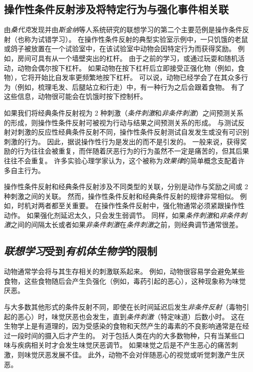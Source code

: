\subsection{操作性条件反射涉及将特定行为与强化事件相关联}

由\textit{桑代克}发现并由\textit{斯金纳}等人系统研究的联想学习的第二个主要范例是操作条件反射（也称为试错学习）。
在操作性条件反射的典型实验室示例中，一只饥饿的老鼠或鸽子被放置在一个试验室中，在该试验室中动物会因特定行为而获得奖励。
例如，房间可具有从一个墙壁突出的杠杆。
由于之前的学习，或通过玩耍和随机活动，动物会偶尔按下杠杆。
如果动物在按下杠杆后立即接受正强化物（例如，食物），它将开始比自发率更频繁地按下杠杆。
可以说，动物已经学会了在其众多行为（例如，梳理毛发、后腿站立和行走）中，有一种行为之后会跟着食物。
有了这些信息，动物很可能会在饥饿时按下控制杆。


如果我们将经典条件反射视为 2 种刺激（\textit{条件刺激}和\textit{非条件刺激}）之间预测关系的形成，则操作性条件反射可被视为行动与结果之间预测关系的形成。
与测试反射对刺激的反应性经典条件反射不同，操作性条件反射测试自发发生或没有可识别刺激的行为。
因此，据说操作性行为是发出的而不是引发的。
一般来说，获得奖励的行为往往会被重复，而伴随着厌恶行为的行为虽然不一定是痛苦的，但其后果往往不会重复。
许多实验心理学家认为，这个被称为\textit{效果律}的简单概念支配着许多自主行为。


操作性条件反射和经典条件反射涉及不同类型的关联，分别是动作与奖励之间或 2 种刺激之间的关联。
然而，操作性条件反射和经典条件反射的规律非常相似。
例如，时机对两者都至关重要。
在操作性条件反射中，强化物通常必须紧跟操作性动作。
如果强化剂延迟太久，只会发生弱调节。
同样，如果\textit{条件刺激}和\textit{非条件刺激}之间的间隔太长或者如果\textit{非条件刺激}在\textit{条件刺激}之前，则经典调节通常很差。



\subsection{\textit{联想学习}受到\textit{有机体生物学}的限制}

动物通常学会将与其生存相关的刺激联系起来。
例如，动物很容易学会避免某些食物，这些食物随后会产生负强化（例如，毒药引起的恶心），这种现象称为味觉厌恶。


与大多数其他形式的条件反射不同，即使在长时间延迟后发生\textit{非条件反射}（毒物引起的恶心）时，味觉厌恶也会发生，直到\textit{条件刺激}（特定味道）后数小时。
这在生物学上是有道理的，因为受感染的食物和天然产生的毒素的不良影响通常是在经过一段时间的摄入后才产生的。
对于包括人类在内的大多数物种，只有当某些口味与疾病相关时才会发生味觉厌恶调节。
如果味觉之后是不产生恶心的痛苦刺激，则味觉厌恶发展不佳。
此外，动物不会对伴随恶心的视觉或听觉刺激产生厌恶。



